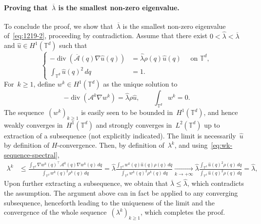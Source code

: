 \documentclass{article}
\newcommand{\dps}{\displaystyle }
\renewcommand{\leq}{\leqslant}
\renewcommand{\geq}{\geqslant}
\def\T{\mathbb{T}}
\newcommand{\A}{\mathcal{A}}
\renewcommand{\dim}{d}
\begin{document}
\paragraph{Proving that~$\overline{\lambda}$ is the smallest non-zero eigenvalue.}
To conclude the proof, we show that~$\overline{\lambda}$ is the smallest non-zero eigenvalue of~\eqref{eq:1219-2}, proceeding by contradiction. Assume that there exist $0<\widehat{\lambda}<\overline{\lambda}$ and $\widehat{u}\in H^1(\T^\dim)$ such that 
\begin{equation}
\left\{\begin{aligned}
-\operatorname{div}\left(\overline{\mathcal{A}}(q)\nabla \widehat{u}(q)\right) & = \widehat{\lambda}\rho(q)\widehat{u}(q)  \quad \text{ on } \T^\dim,\\
\int_{\T^\dim} \widehat{u}(q)^2 \, dq & = 1.
\end{aligned}\right.
\end{equation} 
For~$k \geq 1$, define $w^k \in H^1(\T^\dim)$ as the unique solution to
\begin{equation}
  \label{eq:wk-sequence-spectral}
  -\operatorname{div}(\mathcal{A}^k\nabla w^k) = \widehat{\lambda} \rho \widehat{u}, \qquad \int_{\T^\dim} w^k = 0.
\end{equation}
The sequence~$(w^k)_{k \geq 1}$ is easily seen to be bounded in~$H^1(\T^\dim)$, and hence weakly converges in~$H^1(\T^\dim)$ and strongly converges in~$L^2(\T^\dim)$ up to extraction of a subsequence (not explicitly indicated). The limit is necessarily~$\widehat{u}$ by definition of $H$-convergence. Then, by definition of~$\lambda^k$, and using~\eqref{eq:wk-sequence-spectral},
\[
\begin{aligned}
  \lambda^k & \leq \frac{\dps \int_{\T^\dim}\nabla w^k(q)^\top \A^k(q)\nabla w^k(q)\,dq}{\dps \int_{\T^\dim} w^k(q)^2 \rho^k(q) \, dq} = \widehat{\lambda} \frac{\dps \int_{\T^\dim} w^k(q)\widehat{u}(q) \rho(q)\, dq}{\dps \int_{\T^\dim} w^k(q)^2 \rho^k(q) \, dq} \xrightarrow[k \to +\infty]{} \widehat{\lambda} \frac{\dps \int_{\T^\dim} \widehat{u}(q)^2 \rho(q) \, dq}{\dps \int_{\T^\dim} \widehat{u}(q)^2\rho(q) \, dq} = \widehat{\lambda},
\end{aligned}
\]
Upon further extracting a subsequence, we obtain that $\overline{\lambda} \leq \widehat{\lambda}$, which contradicts the assumption. The argument above can in fact be applied to any converging subsequence, henceforth leading to the uniqueness of the limit and the convergence of the whole sequence~$(\lambda^k)_{k \geq 1}$, which completes the proof.
 
\end{document}
